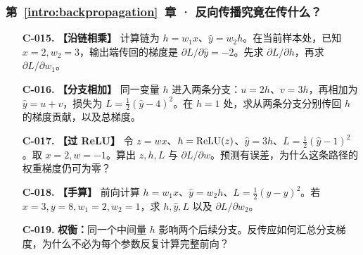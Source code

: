 \subsubsection*{第~\ref*{intro:backpropagation}~章 · 反向传播究竟在传什么？}
\begin{enumerate}[label={},leftmargin=4.8em,itemsep=4pt]
\item[\textbf{C-015.}] \leavevmode{}\label{exercise:C-015}\label{exercise:local-chain-gradient}\textbf{【沿链相乘】} 计算链为 $h=w_1x$、$\widehat{y}=w_2h$。在当前样本处，已知 $x=2,w_2=3$，输出端传回的梯度是 $\partial L/\partial\widehat{y}=-2$。先求 $\partial L/\partial h$，再求 $\partial L/\partial w_1$。
\item[\textbf{C-016.}] \leavevmode{}\label{exercise:C-016}\label{exercise:branch-gradient-sum}\textbf{【分支相加】} 同一变量 $h$ 进入两条分支：$u=2h$、$v=3h$，再相加为 $\widehat{y}=u+v$，损失为 $L=\tfrac12(\widehat{y}-4)^2$。在 $h=1$ 处，求从两条分支分别传回 $h$ 的梯度贡献，以及总梯度。
\item[\textbf{C-017.}] \leavevmode{}\label{exercise:C-017}\label{exercise:relu-blocked-gradient}\textbf{【过 ReLU】} 令 $z=wx$、$h=\operatorname{ReLU}(z)$、$\widehat{y}=3h$、$L=\tfrac12(\widehat{y}-1)^2$。取 $x=2,w=-1$。算出 $z,h,L$ 与 $\partial L/\partial w$。预测有误差，为什么这条路径的权重梯度仍可为零？
\item[\textbf{C-018.}] \leavevmode{}\label{exercise:C-018}\label{exercise:scalar-chain-forward}\textbf{【手算】} 前向计算 $h=w_1x$、$\widehat{y}=w_2h$、$L=\tfrac12(\widehat{y}-y)^2$。若 $x=3,y=8,w_1=2,w_2=1$，求 $h,\widehat{y},L$ 以及 $\partial L/\partial w_2$。
\item[\textbf{C-019.}] \leavevmode{}\label{exercise:C-019}\label{exercise:branch-gradient-reuse}\textbf{权衡：}同一个中间量 $h$ 影响两个后续分支。反传应如何汇总分支梯度，为什么不必为每个参数反复计算完整前向？
\end{enumerate}
